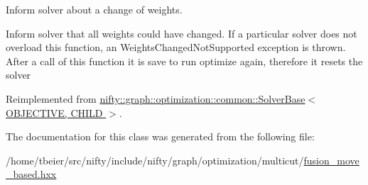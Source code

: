 Inform solver about a change of weights. 

Inform solver that all weights could have changed. If a particular solver does not overload this function, an Weights\+Changed\+Not\+Supported exception is thrown. After a call of this function it is save to run optimize again, therefore it resets the solver 

Reimplemented from \hyperlink{classnifty_1_1graph_1_1optimization_1_1common_1_1SolverBase_a8ab38d61068370e24cca475ef1b5d8b1}{nifty\+::graph\+::optimization\+::common\+::\+Solver\+Base$<$ O\+B\+J\+E\+C\+T\+I\+V\+E, C\+H\+I\+L\+D $>$}.



The documentation for this class was generated from the following file\+:\begin{DoxyCompactItemize}
\item 
/home/tbeier/src/nifty/include/nifty/graph/optimization/multicut/\hyperlink{multicut_2fusion__move__based_8hxx}{fusion\+\_\+move\+\_\+based.\+hxx}\end{DoxyCompactItemize}
